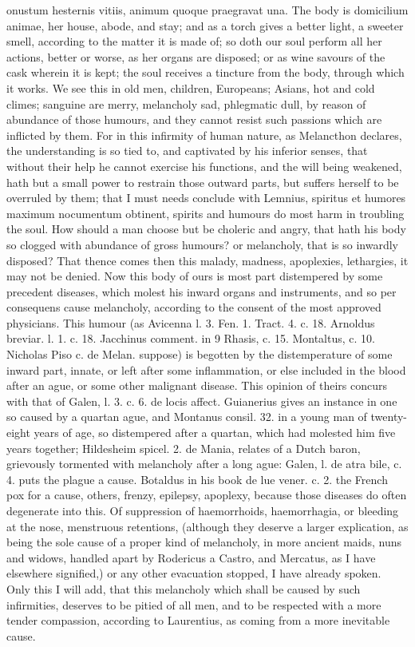 {onustum hesternis vitiis, animum quoque praegravat una. The body is
domicilium animae, her house, abode, and stay; and as a torch gives a
better light, a sweeter smell, according to the matter it is made of;
so doth our soul perform all her actions, better or worse, as her
organs are disposed; or as wine savours of the cask wherein it is kept;
the soul receives a tincture from the body, through which it works. We
see this in old men, children, Europeans; Asians, hot and cold climes;
sanguine are merry, melancholy sad, phlegmatic dull, by reason of
abundance of those humours, and they cannot resist such passions which
are inflicted by them. For in this infirmity of human nature, as
Melancthon declares, the understanding is so tied to, and captivated by
his inferior senses, that without their help he cannot exercise his
functions, and the will being weakened, hath but a small power to
restrain those outward parts, but suffers herself to be overruled by
them; that I must needs conclude with Lemnius, spiritus et humores
maximum nocumentum obtinent, spirits and humours do most harm in
troubling the soul. How should a man choose but be choleric and
angry, that hath his body so clogged with abundance of gross humours?
or melancholy, that is so inwardly disposed? That thence comes then
this malady, madness, apoplexies, lethargies, \etc{} it may not be denied.
Now this body of ours is most part distempered by some precedent
diseases, which molest his inward organs and instruments, and so per
consequens cause melancholy, according to the consent of the most
approved physicians. This humour (as Avicenna l. 3. Fen. 1.
Tract. 4. c. 18. Arnoldus breviar. l. 1. c. 18. Jacchinus comment. in 9
Rhasis, c. 15. Montaltus, c. 10. Nicholas Piso c. de Melan. \etc{}
suppose) is begotten by the distemperature of some inward part, innate,
or left after some inflammation, or else included in the blood after an
ague, or some other malignant disease. This opinion of theirs
concurs with that of Galen, l. 3. c. 6. de locis affect. Guianerius
gives an instance in one so caused by a quartan ague, and Montanus
consil. 32. in a young man of twenty-eight years of age, so distempered
after a quartan, which had molested him five years together; Hildesheim
spicel. 2. de Mania, relates of a Dutch baron, grievously tormented
with melancholy after a long ague: Galen, l. de atra bile, c. 4.
puts the plague a cause. Botaldus in his book de lue vener. c. 2. the
French pox for a cause, others, frenzy, epilepsy, apoplexy, because
those diseases do often degenerate into this. Of suppression of
haemorrhoids, haemorrhagia, or bleeding at the nose, menstruous
retentions, (although they deserve a larger explication, as being the
sole cause of a proper kind of melancholy, in more ancient maids, nuns
and widows, handled apart by Rodericus a Castro, and Mercatus, as I
have elsewhere signified,) or any other evacuation stopped, I have
already spoken. Only this I will add, that this melancholy which shall
be caused by such infirmities, deserves to be pitied of all men, and to
be respected with a more tender compassion, according to Laurentius, as
coming from a more inevitable cause.

}
